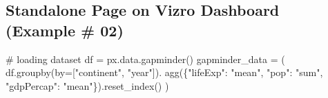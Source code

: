 \documentclass[
  letterpaper,
  DIV=11,
  numbers=noendperiod]{scrreprt}
\newenvironment{Shaded}{\begin{snugshade}}{\end{snugshade}}
\newcommand{\CommentTok}[1]{\textcolor[rgb]{0.37,0.37,0.37}{#1}}
\newcommand{\NormalTok}[1]{\textcolor[rgb]{0.00,0.23,0.31}{#1}}
\newcommand{\OperatorTok}[1]{\textcolor[rgb]{0.37,0.37,0.37}{#1}}
\newcommand{\StringTok}[1]{\textcolor[rgb]{0.13,0.47,0.30}{#1}}
\begin{document}
\subsection{Standalone Page on Vizro Dashboard (Example \#
02)}\label{standalone-page-on-vizro-dashboard-example-02}

\begin{Shaded}
\begin{Highlighting}[]
\CommentTok{\# loading dataset }
\NormalTok{df }\OperatorTok{=}\NormalTok{ px.data.gapminder()}
\NormalTok{gapminder\_data }\OperatorTok{=}\NormalTok{ (}
\NormalTok{        df.groupby(by}\OperatorTok{=}\NormalTok{[}\StringTok{"continent"}\NormalTok{, }\StringTok{"year"}\NormalTok{]).}
\NormalTok{            agg(\{}\StringTok{"lifeExp"}\NormalTok{: }\StringTok{"mean"}\NormalTok{, }\StringTok{"pop"}\NormalTok{: }\StringTok{"sum"}\NormalTok{, }\StringTok{"gdpPercap"}\NormalTok{: }\StringTok{"mean"}\NormalTok{\}).reset\_index()}
\NormalTok{    )}
\end{Highlighting}
\end{Shaded}
\end{document}
